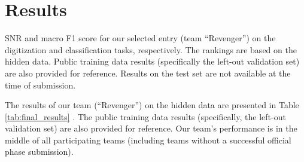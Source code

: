 \section{Results}
\label{sec:results}

\begin{table}[!htp]
\centering

\caption{SNR and macro F1 score for our selected entry (team ``Revenger'') on the digitization and classification tasks, respectively. The rankings are based on the hidden data. Public training data results (specifically the left-out validation set) are also provided for reference. Results on the test set are not available at the time of submission.}
\label{tab:final_results}
\end{table}

The results of our team (``Revenger'') on the hidden data \cite{reyna2024_cinc2024_database} are presented in Table \ref{tab:final_results} 
. The public training data results (specifically, the left-out validation set) are also provided for reference. Our team's performance is in the middle of all participating teams (including teams without a successful official phase submission).
